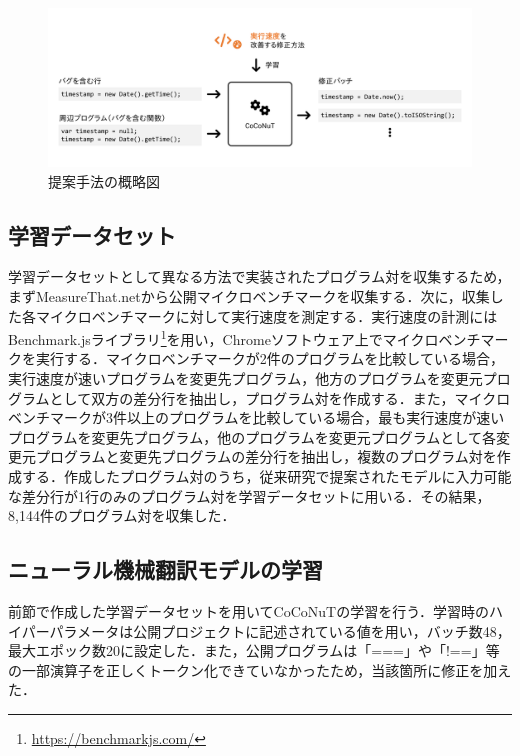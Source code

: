 \documentclass[submit,ses,noauthor]{ipsj}
\begin{document}
\begin{figure}[t]
\centering
\includegraphics[width=0.95\linewidth]{figure/coconut.pdf}
\vspace{-4mm}
\caption{提案手法の概略図}
\vspace{-4mm}
\label{figure:coconut}
\end{figure}



\subsection{学習データセット}

学習データセットとして異なる方法で実装されたプログラム対を収集するため，まずMeasureThat.netから公開マイクロベンチマークを収集する．次に，収集した各マイクロベンチマークに対して実行速度を測定する．実行速度の計測にはBenchmark.jsライブラリ\footnote{\url{https://benchmarkjs.com/}}を用い，Chromeソフトウェア上でマイクロベンチマークを実行する．マイクロベンチマークが2件のプログラムを比較している場合，実行速度が速いプログラムを変更先プログラム，他方のプログラムを変更元プログラムとして双方の差分行を抽出し，プログラム対を作成する．また，マイクロベンチマークが3件以上のプログラムを比較している場合，最も実行速度が速いプログラムを変更先プログラム，他のプログラムを変更元プログラムとして各変更元プログラムと変更先プログラムの差分行を抽出し，複数のプログラム対を作成する．作成したプログラム対のうち，従来研究で提案されたモデルに入力可能な差分行が1行のみのプログラム対を学習データセットに用いる．その結果，8,144件のプログラム対を収集した．


\subsection{ニューラル機械翻訳モデルの学習}

前節で作成した学習データセットを用いてCoCoNuTの学習を行う．学習時のハイパーパラメータは公開プロジェクトに記述されている値を用い，バッチ数48，最大エポック数20に設定した．また，公開プログラムは「===」や「!==」等の一部演算子を正しくトークン化できていなかったため，当該箇所に修正を加えた．
\end{document}
